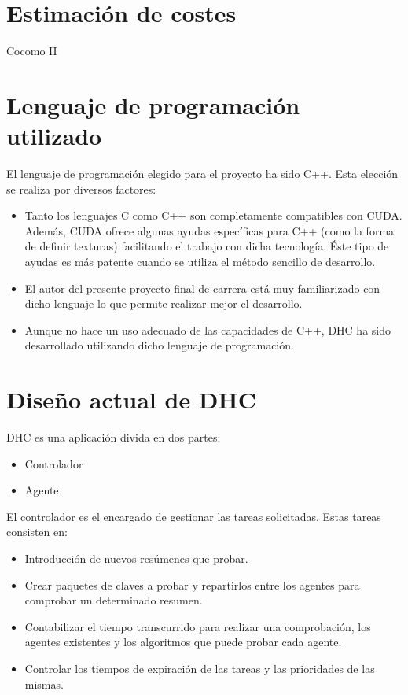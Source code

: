 \section{Estimación de costes}
Cocomo II

\section{Lenguaje de programación utilizado}
El lenguaje de programación elegido para el proyecto ha sido C++. Esta elección se realiza por diversos factores:

\begin{itemize}
	\item Tanto los lenguajes C como C++ son completamente compatibles con CUDA. Además, CUDA ofrece algunas ayudas específicas para C++ (como la forma de definir texturas) facilitando el trabajo con dicha tecnología. Éste tipo de ayudas es más patente cuando se utiliza el método sencillo de desarrollo.
	\item El autor del presente proyecto final de carrera está muy familiarizado con dicho lenguaje lo que permite realizar mejor el desarrollo.
	\item Aunque no hace un uso adecuado de las capacidades de C++, DHC ha sido desarrollado utilizando dicho lenguaje de programación.
\end{itemize}

\section{Diseño actual de DHC}

DHC es una aplicación divida en dos partes:
\begin{itemize}
	\item Controlador
	\item Agente
\end{itemize}

El controlador es el encargado de gestionar las tareas solicitadas. Estas tareas consisten en:
\begin{itemize}
	\item Introducción de nuevos resúmenes que probar.
	\item Crear paquetes de claves a probar y repartirlos entre los agentes para comprobar un determinado resumen.
	\item Contabilizar el tiempo transcurrido para realizar una comprobación, los agentes existentes y los algoritmos que puede probar cada agente.
	\item Controlar los tiempos de expiración de las tareas y las prioridades de las mismas.
\end{itemize}

